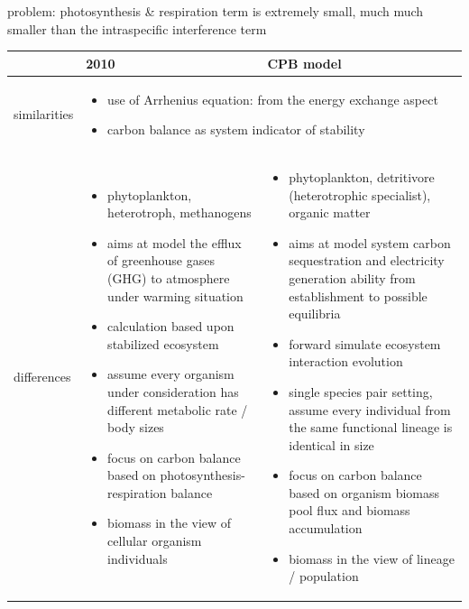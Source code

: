 \documentclass[a4paper,11pt]{article}
\begin{document}
problem: photosynthesis \& respiration term is extremely small, much much smaller than the intraspecific interference term

\clearpage

\begin{longtable}{p{.15\linewidth}|p{.35\linewidth}|p{.35\linewidth}|}
& 2010 & CPB model\\\hline
similarities & \multicolumn{2}{p{.7\linewidth}|}{\begin{itemize}
    \item use of Arrhenius equation: from the energy exchange aspect
    \item carbon balance as system indicator of stability
\end{itemize}}\\\hline
differences & \begin{itemize}
    \item phytoplankton, heterotroph, methanogens
    \item aims at model the efflux of greenhouse gases (GHG) to atmosphere under warming situation
    \item calculation based upon stabilized ecosystem
    \item assume every organism under consideration has different metabolic rate / body sizes
    \item focus on carbon balance based on photosynthesis-respiration balance
    \item biomass in the view of cellular organism individuals
\end{itemize} & \begin{itemize}
    \item phytoplankton, detritivore (heterotrophic specialist), organic matter
    \item aims at model system carbon sequestration and electricity generation ability from establishment to possible equilibria
    \item forward simulate ecosystem interaction evolution
    \item single species pair setting, assume every individual from the same functional lineage is identical in size
    \item focus on carbon balance based on organism biomass pool flux and biomass accumulation
    \item biomass in the view of lineage / population
\end{itemize}
\end{longtable}
\end{document}
